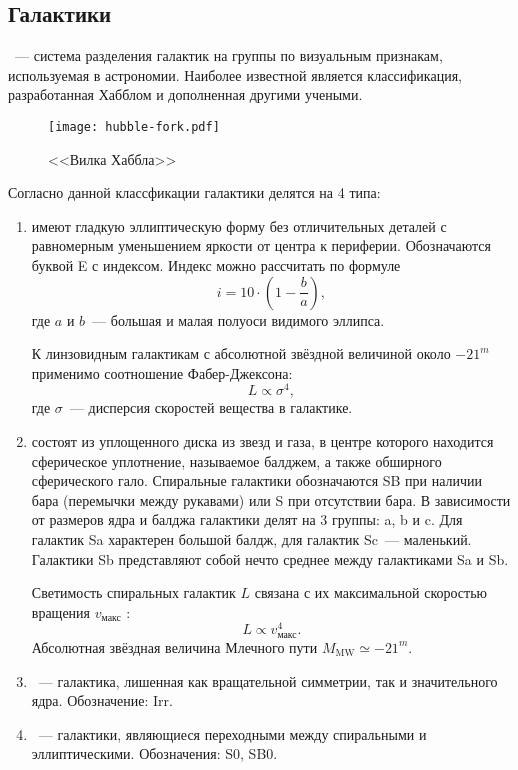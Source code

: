 \subsection{Галактики}
~--- система разделения галактик на группы по визуальным признакам, используемая в астрономии. Наиболее известной является классификация, разработанная Хабблом и дополненная другими учеными. 
	\begin{figure}[h!]
		\centering
		\vspace{-.9pc}
		\texttt{[image: hubble-fork.pdf]}
		\caption{<<Вилка Хаббла>>}
	\end{figure}
	
Согласно данной классфикации галактики делятся на 4 типа:
\begin{enumerate}[itemsep=3pt, label={\arabic*.}, leftmargin=1pc]
	\item{ имеют гладкую эллиптическую форму без отличительных деталей с равномерным уменьшением яркости от центра к периферии. Обозначаются буквой E с индексом. Индекс можно рассчитать по формуле
		\begin{equation}
		i = 10 \cdot \left(1 - \frac{b}{a}\right),
		\end{equation}\nopagebreak
		где $a$ и $b$~--- большая и малая полуоси видимого эллипса. 
		
		К линзовидным галактикам с абсолютной звёздной величиной около $-21^m$ применимо соотношение Фабер-Джексона:
		\begin{equation}
			L \propto \sigma^4,
		\end{equation}
		где $\sigma$~--- дисперсия скоростей вещества в галактике.}
	\item{ состоят из уплощенного диска из звезд и газа, в центре которого находится сферическое уплотнение, называемое балджем, а также обширного сферического гало. Спиральные галактики обозначаются SB при наличии бара (перемычки между рукавами) или S при отсутствии бара. В зависимости от размеров ядра и балджа галактики делят на 3 группы: a, b и c. Для галактик Sa характерен большой балдж, для галактик Sc~--- маленький. Галактики Sb представляют собой нечто среднее между галактиками Sa и Sb.
	
	Светимость спиральных галактик $L$ связана с их максимальной скоростью вращения $v_\text{макс}$ :
	\begin{equation}
		L \propto v_\text{макс}^4.
	\end{equation}
	Абсолютная звёздная величина Млечного пути $M_\text{MW} \simeq -21^m$.}
	\item{~--- галактика, лишенная как вращательной симметрии, так и значительного ядра. Обозначение: Irr.}
	\item{~--- галактики, являющиеся переходными между спиральными и эллиптическими. Обозначения: S0, SB0.}
\end{enumerate}

